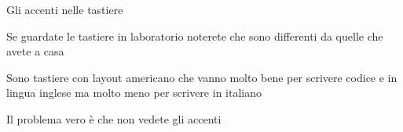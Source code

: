 \begin{frame}{Gli accenti nelle tastiere}

Se guardate le tastiere in laboratorio noterete che sono differenti da quelle
che avete a casa

\vfill

Sono tastiere con layout americano che vanno molto bene per scrivere codice
e in lingua inglese ma molto meno per scrivere in italiano

\vfill

Il problema vero è che non vedete gli accenti

\end{frame}
